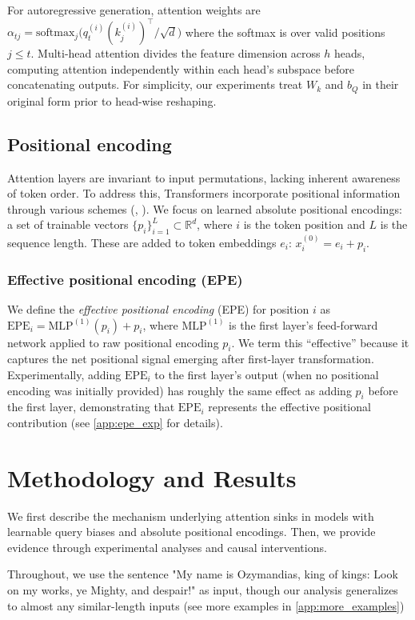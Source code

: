 \documentclass[11pt]{article}
\begin{document}
For autoregressive generation, attention weights are $\alpha_{t j}=\mathrm{softmax}_j\!\big(q_t^{(i)} (k_j^{(i)})^\top / \sqrt{d}\big)$ where the softmax is over valid positions $j \le t$. Multi-head attention divides the feature dimension across $h$ heads, computing attention independently within each head's subspace before concatenating outputs. For simplicity, our experiments treat $W_k$ and $b_Q$ in their original form prior to head-wise reshaping.

\subsection{Positional encoding}
Attention layers are invariant to input permutations, lacking inherent awareness of token order. To address this, Transformers incorporate positional information through various schemes (\citet{su2021roformer}, \citet{press2021train}). We focus on learned absolute positional encodings: a set of trainable vectors $\{p_i\}_{i=1}^{L} \subset \mathbb{R}^{d}$, where $i$ is the token position and $L$ is the sequence length. These are added to token embeddings $e_i$: $x_i^{(0)} = e_i + p_i$.

\subsubsection{Effective positional encoding (EPE)}
We define the \emph{effective positional encoding} (EPE) for position $i$ as $\mathrm{EPE}_i = \mathrm{MLP}^{(1)}(p_i) + p_i$, where $\mathrm{MLP}^{(1)}$ is the first layer's feed-forward network applied to raw positional encoding $p_i$. We term this ``effective'' because it captures the net positional signal emerging after first-layer transformation. Experimentally, adding $\mathrm{EPE}_i$ to the first layer's output (when no positional encoding was initially provided) has roughly the same effect as adding $p_i$ before the first layer, demonstrating that $\mathrm{EPE}_i$ represents the effective positional contribution (see \cref{app:epe_exp} for details).

\section{Methodology and Results}
We first describe the mechanism underlying attention sinks in models with learnable query biases and absolute positional encodings. Then, we provide evidence through experimental analyses and causal interventions.

Throughout, we use the sentence "My name is Ozymandias, king of kings: Look on my works, ye Mighty, and despair!" as input, though our analysis generalizes to almost any similar-length inputs (see more examples in \cref{app:more_examples})
\end{document}
